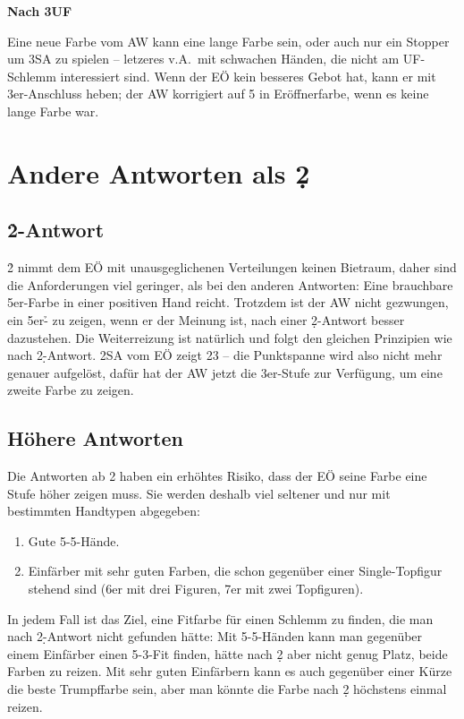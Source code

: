 
\textbf{Nach 3UF}

Eine neue Farbe vom AW kann eine lange Farbe sein, oder auch nur ein Stopper um 3SA zu spielen -- letzeres v.A.\ mit schwachen Händen, die nicht am UF-Schlemm interessiert sind.
Wenn der EÖ kein besseres Gebot hat, kann er mit 3er-Anschluss heben; der AW korrigiert auf 5 in Eröffnerfarbe, wenn es keine lange Farbe war.

\section{Andere Antworten als 2\d}

\subsection*{2\h{}-Antwort}

2\h{} nimmt dem EÖ mit unausgeglichenen Verteilungen keinen Bietraum, daher sind die Anforderungen viel geringer, als bei den anderen Antworten:
Eine brauchbare 5er-Farbe in einer positiven Hand reicht.
Trotzdem ist der AW nicht gezwungen, ein 5er-\h{} zu zeigen, wenn er der Meinung ist, nach einer 2\d{}-Antwort besser dazustehen.
Die Weiterreizung ist natürlich und folgt den gleichen Prinzipien wie nach 2\d-Antwort.
2SA vom EÖ zeigt 23\rplus{} -- die Punktspanne wird also nicht mehr genauer aufgelöst, dafür hat der AW jetzt die 3er-Stufe zur Verfügung, um eine zweite Farbe zu zeigen.

\subsection*{Höhere Antworten}

Die Antworten ab 2\s{} haben ein erhöhtes Risiko, dass der EÖ seine Farbe eine Stufe höher zeigen muss.
Sie werden deshalb viel seltener und nur mit bestimmten Handtypen abgegeben:
\begin{enumerate}
\item Gute 5-5-Hände.
\item Einfärber mit sehr guten Farben, die schon gegenüber einer Single-Topfigur
stehend sind (6er mit drei Figuren, 7er mit zwei Topfiguren).
\end{enumerate}

In jedem Fall ist das Ziel, eine Fitfarbe für einen Schlemm zu finden, die man nach
2\d-Antwort nicht gefunden hätte: Mit 5-5-Händen kann man gegenüber einem Einfärber
einen 5-3-Fit finden, hätte nach 2\d{} aber nicht genug Platz, beide Farben zu reizen.
Mit sehr guten Einfärbern kann es auch gegenüber einer Kürze die beste Trumpffarbe sein,
aber man könnte die Farbe nach 2\d{} höchstens einmal reizen.

